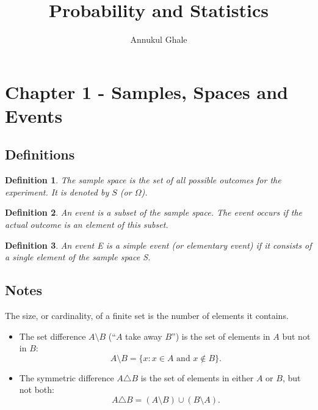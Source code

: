 \documentclass[12pt]{article}
\newtheorem{definition}{Definition}
\begin{document}
\title{\textbf{Probability and Statistics}}
\author{Annukul Ghale}


\maketitle

\tableofcontents
\newpage



\section{Chapter 1 - Samples, Spaces and Events}
\subsection{Definitions}
\begin{definition}
The sample space is the set of all possible outcomes for the experiment. It is denoted by $S$ (or $\Omega$).
\end{definition}

\begin{definition}
An event is a subset of the sample space. The event occurs if
the actual outcome is an element of this subset.
\end{definition}

\begin{definition}
An event E is a simple event (or elementary event) if it
consists of a single element of the sample space S.
\end{definition}

\subsection{Notes}
The size, or cardinality, of a finite set is the number of elements it contains.

\begin{itemize}
\item The set difference $A \setminus B$ (``$A$ take away $B$'') is the set of elements in $A$ but not in $B$:
\[
A \setminus B = \{x : x \in A \text{ and } x \notin B\}.
\]
\item The symmetric difference $A \triangle B$ is the set of elements in either $A$ or $B$, but not both:
\[
A \triangle B = (A \setminus B) \cup (B \setminus A).
\]
\end{itemize}
\end{document}
